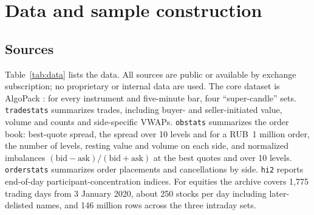 \section{Data and sample construction}\label{sec:data}

\subsection{Sources}

Table~\ref{tab:data} lists the data. All sources are public or available by exchange subscription; no proprietary or internal data are used. The core dataset is AlgoPack \citep{moexalgo}: for every instrument and five-minute bar, four ``super-candle'' sets. \texttt{tradestats} summarizes trades, including buyer- and seller-initiated value, volume and counts and side-specific VWAPs. \texttt{obstats} summarizes the order book: best-quote spread, the spread over 10 levels and for a RUB~1 million order, the number of levels, resting value and volume on each side, and normalized imbalances $(\text{bid}-\text{ask})/(\text{bid}+\text{ask})$ at the best quotes and over 10 levels. \texttt{orderstats} summarizes order placements and cancellations by side. \texttt{hi2} reports end-of-day participant-concentration indices. For equities the archive covers 1,775 trading days from 3 January 2020, about 250 stocks per day including later-delisted names, and 146 million rows across the three intraday sets.


